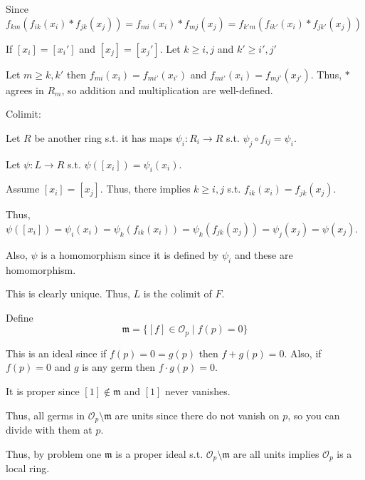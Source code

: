 \documentclass[12pt, letterpaper]{article}
\newcommand{\mf}[1]{\mathfrak{#1}}
\begin{document}
\begin{problemproof}
    Since $f_{km}(f_{ik}(x_i)*f_{jk}(x_j))=f_{mi}(x_i)*f_{mj}(x_j)=f_{k'm}(f_{ik'}(x_i)*f_{jk'}(x_j))$

    If $[x_i]=[x_i']$ and $[x_j]=[x_j']$. Let $k \geq i,j$ and $k' \geq i',j'$

    Let $m \geq k,k'$ then $f_{mi}(x_i)=f_{mi'}(x_{i'})$ and $f_{mi'}(x_i)=f_{mj'}(x_{j'})$. Thus, $*$ agrees in $R_m$, so addition and multiplication are well-defined.

    Colimit:

    Let $R$ be another ring s.t. it has maps $\psi_i : R_i \to R$ s.t. $\psi_j \circ f_{ij} = \psi_i$.

    Let $\psi: L \to R$ s.t. $\psi([x_i])=\psi_i(x_i)$.

    Assume $[x_i]=[x_j]$. Thus, there implies $k \geq i,j$ s.t. $f_{ik}(x_i)=f_{jk}(x_j)$.

    Thus, $\psi([x_i])=\psi_{i}(x_i)=\psi_k(f_{ik}(x_i))=\psi_k(f_{jk}(x_j))=\psi_{j}(x_j)=\psi(x_j)$.

    Also, $\psi$ is a homomorphism since it is defined by $\psi_i$ and these are homomorphism.

    This is clearly unique. Thus, $L$ is the colimit of $F$.
\end{problemproof}

\begin{subproblem}{}
    
\end{subproblem}
\begin{problemproof}
    Define
    \[\mf{m} = \{[f] \in \mathcal{O}_p \mid f(p)=0\}\]

    This is an ideal since if $f(p)=0=g(p)$ then $f+g(p)=0$. Also, if $f(p)=0$ and $g$ is any germ then $f\cdot g(p)=0$.

    It is proper since $[1] \notin \mf{m}$ and $[1]$ never vanishes.

    Thus, all germs in $\mathcal{O}_p \setminus \mf{m}$ are units since there do not vanish on $p$, so you can divide with them at $p$.

    Thus, by problem one $\mf{m}$ is a proper ideal s.t. $\mathcal{O}_p \setminus \mf{m}$ are all units implies $\mathcal{O}_p$ is a local ring.
\end{problemproof}
\end{document}
